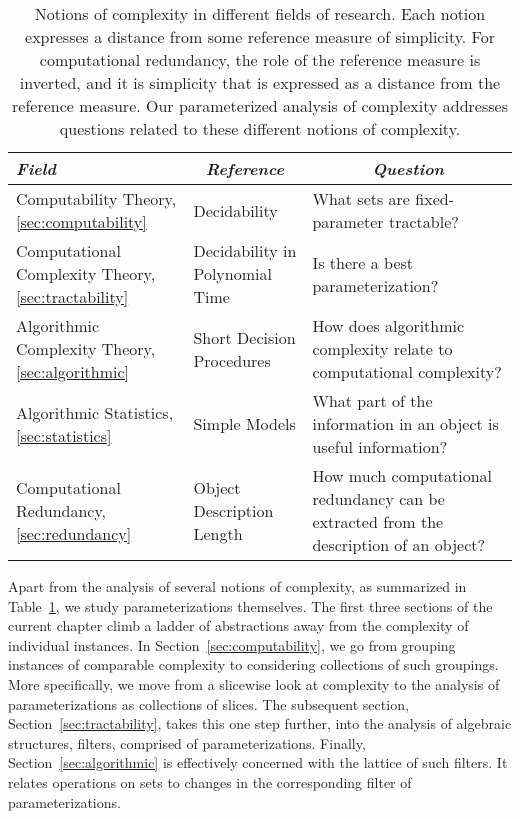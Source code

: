 \begin{table}
  \centering
  \begin{tabular}{p{4cm}p{3cm}p{6.266cm}}
    \multicolumn{1}{l}{\hfill\emph{Field}\rlap{,}\hfill\llap{\emph{\S}}} & \multicolumn{1}{c}{\emph{Reference}} & \multicolumn{1}{c}{\emph{Question}} \\
    \hline\noalign{\vspace{1.25ex}}
    Computability Theory, \hspace*{\fill}\ref{sec:computability} & Decidability & What sets are fixed-parameter tractable? \\[1.75ex]
    Computational Complexity Theory, \hspace*{\fill}\ref{sec:tractability} & Decidability in Polynomial Time & Is there a best parameterization?\newline \\[1.75ex]
    Algorithmic Complexity Theory, \hspace*{\fill}\ref{sec:algorithmic} & Short Decision Procedures & How does algorithmic complexity relate to computational complexity? \\[1.75ex]
    Algorithmic Statistics, \hspace*{\fill}\ref{sec:statistics} & Simple Models & What part of the information in an object is useful information? \\[1.75ex]
    Computational Redundancy, \hspace*{\fill}\ref{sec:redundancy} & Object Description Length & How much computational redundancy can be extracted from the description of an object?
  \end{tabular}
  \caption{
    Notions of complexity in different fields of research.
    Each notion expresses a distance from some reference measure of simplicity.
    For computational redundancy, the role of the reference measure is inverted, and it is simplicity that is expressed as a distance from the reference measure.
    Our parameterized analysis of complexity addresses questions related to these different notions of complexity.
  }
  \label{tab:summary}
\end{table}

Apart from the analysis of several notions of complexity, as summarized in Table~\ref{tab:summary}, we study parameterizations themselves.
The first three sections of the current chapter climb a ladder of abstractions away from the complexity of individual instances.
In Section~\ref{sec:computability}, we go from grouping instances of comparable complexity to considering collections of such groupings.
More specifically, we move from a slicewise look at complexity to the analysis of parameterizations as collections of slices.
The subsequent section, Section~\ref{sec:tractability}, takes this one step further, into the analysis of algebraic structures, filters, comprised of parameterizations.
Finally, Section~\ref{sec:algorithmic} is effectively concerned with the lattice of such filters.
It relates operations on sets to changes in the corresponding filter of parameterizations.

